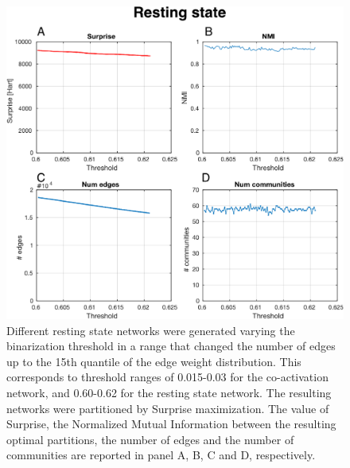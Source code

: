 \begin{figure}[htb!]
\centering
\includegraphics[width=0.7\linewidth]{images/resting_state_study_threshold.pdf}
\caption{Different resting state networks were generated varying the binarization threshold in a range that changed the number of edges up to the 15th quantile of the edge weight distribution. This corresponds to threshold ranges of 0.015-0.03 for the co-activation network, and 0.60-0.62 for the resting state network. The resulting networks were partitioned by Surprise maximization. The value of Surprise, the Normalized Mutual Information between the resulting optimal partitions, the number of edges and the number of communities are reported in panel A, B, C and D, respectively.}
\label{fig:figure_9_rs_threshold_study}
\end{figure}

